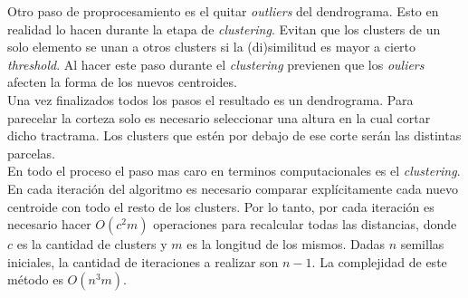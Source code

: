 \vspace{0.1cm}

Otro paso de proprocesamiento es el quitar \textit{outliers} del dendrograma.
Esto en realidad lo hacen durante la etapa de \textit{clustering}. Evitan que los
clusters de un solo elemento se unan a otros clusters si la (di)similitud es 
mayor a cierto \textit{threshold}. Al hacer este paso durante el \textit{clustering}
previenen que los \textit{ouliers} afecten la forma de los nuevos centroides.\\

Una vez finalizados todos los pasos el resultado es un dendrograma. Para parecelar
la corteza solo es necesario seleccionar una altura en la cual cortar dicho
tractrama. Los clusters que est\'en por debajo de ese corte ser\'an las distintas
parcelas. \\

En todo el proceso el paso mas caro en terminos computacionales es el
\textit{clustering}. En cada iteraci\'on del algoritmo es necesario comparar 
expl\'icitamente cada nuevo centroide con todo el resto de los clusters. Por lo
tanto, por cada iteraci\'on es necesario hacer $O(c^2 m)$ operaciones para 
recalcular todas las distancias, donde $c$ es la cantidad de clusters y $m$ es 
la longitud de los mismos. Dadas $n$ semillas iniciales, la cantidad de 
iteraciones a realizar son $n-1$. La complejidad de este m\'etodo es $O(n^3 m)$.
